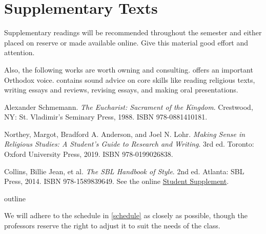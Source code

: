 \documentclass[titlepage]{article}
\begin{document}
\section{Supplementary Texts}
\label{supplementary}

Supplementary readings will be recommended throughout the semester and
either placed on reserve or made available online. Give this material
good effort and attention.

Also, the following works are worth owning and consulting.
\cite{Schmemann} offers an important Orthodox voice. \cite{rlgs}
contains sound advice on core skills like reading religious texts,
writing essays and reviews, revising essays, and making oral
presentations.

\begingroup
\renewcommand{\section}[2]{}%
\begin{thebibliography}{Making Sense}%

	 Alexander Schmemann.
	\emph{The Eucharist: Sacrament of the Kingdom}.
	Crestwood, NY: St. Vladimir’s Seminary Press, 1988. ISBN 978-0881410181.

	 Northey, Margot, Bradford A. Anderson, and Joel N. Lohr.
	\emph{Making Sense in Religious Studies: A Student's Guide to Research and Writing}.
	3rd ed. Toronto: Oxford University Press, 2019. ISBN 978-0199026838.

	 Collins, Billie Jean, et al.
	\emph{The SBL Handbook of Style}.
	2nd ed. Atlanta: SBL Press, 2014. ISBN 978-1589839649.
	See the online \href{https://www.sbl-site.org/wp-content/uploads/2025/04/SBLHSsupp2015-02.pdf}{Student Supplement}.

\end{thebibliography}
\endgroup


\section{Course Outline}
\label{outline}

We will adhere to the schedule in \autoref{schedule} as closely as
possible, though the professors reserve the right to adjust it to suit
the needs of the class.
\end{document}
